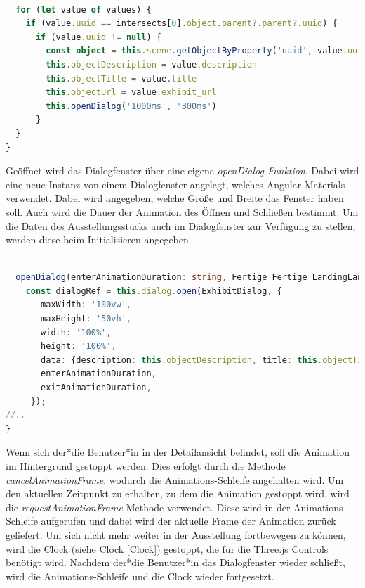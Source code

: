 \begin{lstlisting}[caption={identifizieren des geklickten Ausstellungsstückes},language=TypeScript]
    
  for (let value of values) {
    if (value.uuid == intersects[0].object.parent?.parent?.uuid) {
      if (value.uuid != null) {
        const object = this.scene.getObjectByProperty('uuid', value.uuid);
        this.objectDescription = value.description
        this.objectTitle = value.title
        this.objectUrl = value.exhibit_url
        this.openDialog('1000ms', '300ms')
      }
  }
}

\end{lstlisting}

Geöffnet wird das Dialogfenster über eine eigene \emph{openDialog-Funktion}. Dabei wird eine neue Instanz von einem Dialogfenster angelegt, welches Angular-Materials verwendet. Dabei wird angegeben, welche Größe und Breite das Fenster haben soll. Auch wird die Dauer der Animation des Öffnen und Schließen bestimmt. Um die Daten des Ausstellungsstücks auch im Dialogfenster zur Verfügung zu stellen, werden diese beim Initialisieren angegeben.

\begin{lstlisting}[caption={initialisieren des Dialogfensters},language=TypeScript]
    
  openDialog(enterAnimationDuration: string, Fertige Fertige LandingLandingexitAnimationDuration: string): void {
    const dialogRef = this.dialog.open(ExhibitDialog, {
       maxWidth: '100vw',
       maxHeight: '50vh',
       width: '100%',
       height: '100%',
       data: {description: this.objectDescription, title: this.objectTitle, objectUrl: this.objectUrl},
       enterAnimationDuration,
       exitAnimationDuration,
     });
//..
}
\end{lstlisting}

Wenn sich der*die Benutzer*in in der Detailansicht befindet, soll die Animation im Hintergrund gestoppt werden. Dies erfolgt durch die Methode \emph{cancelAnimationFrame}, wodurch die Animations-Schleife angehalten wird. Um den aktuellen Zeitpunkt zu erhalten, zu dem die Animation gestoppt wird, wird die \emph{requestAnimationFrame} Methode verwendet. Diese wird in der Animations-Schleife aufgerufen und dabei wird der aktuelle Frame der Animation zurück geliefert. Um sich nicht mehr weiter in der Ausstellung fortbewegen zu können, wird die Clock (siehe Clock \ref{Clock}) gestoppt, die für die Three.js Controls benötigt wird. Nachdem der*die Benutzer*in das Dialogfenster wieder schließt, wird die Animations-Schleife und die Clock wieder fortgesetzt. 

